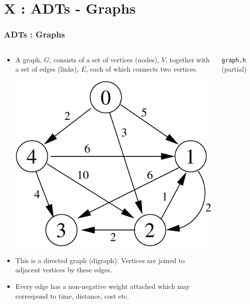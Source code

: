 \section{X : ADTs - Graphs}
\label{chap:adts_graphs}


\begin{frame}[fragile]
\frametitle{ADTs : Graphs}
\begin{columns}[T]

\begin{column}{0.45\textwidth}
\begin{itemize}[<+->]
\item A graph, $G$, consists of a set of vertices (nodes), $V$, together
with a set of edges (links), $E$, each of which connects two vertices.
\begin{center}
\includegraphics[scale=0.3]{../Images/grapha.pdf}
\end{center}
\item This is a directed graph (digraph).
Vertices are joined to adjacent vertices by these edges.
\item Every edge has a non-negative weight attached
which may correspond to time, distance, cost etc.
\end{itemize}
\end{column}

\pause
\begin{column}{0.45\textwidth}
\verb^graph.h^ (partial)

\end{column}

\end{columns}
\end{frame}

